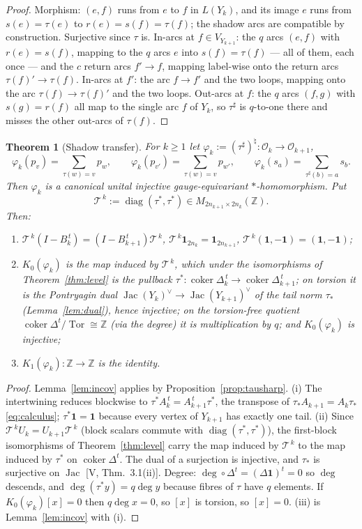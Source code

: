 \documentclass[11pt]{amsart}
\numberwithin{equation}{section}
\newtheorem{theorem}{Theorem}[section]
\theoremstyle{definition}
\theoremstyle{remark}
\newcommand{\Z}{\mathbb{Z}}
\newcommand{\cO}{\mathcal{O}}
\newcommand{\cT}{\mathcal{T}}
\newcommand{\Jac}{\operatorname{Jac}}
\newcommand{\coker}{\operatorname{coker}}
\newcommand{\Tor}{\operatorname{Tor}}
\newcommand{\ta}{\tau_*}
\newcommand{\taup}{\tau^*}
\newcommand{\shadow}[1]{{#1}^{\sharp}}
\newcommand{\Tup}{\cT^{\,k}}
\begin{document}
\begin{proof}
Morphism: $(e,f)$ runs from $e$ to $f$ in $L(Y_k)$, and its image $e$ runs from
$s(e)=\tau(e)$ to $r(e)=s(f)=\tau(f)$; the shadow arcs are compatible by construction.
Surjective since $\tau$ is. In-arcs at $f\in V_{Y_{k+1}}$: the $q$ arcs $(e,f)$ with
$r(e)=s(f)$, mapping to the $q$ arcs $e$ into $s(f)=\tau(f)$ --- all of them, each once ---
and the $c$ return arcs $f'\to f$, mapping label-wise onto the return arcs
$\tau(f)'\to\tau(f)$. In-arcs at $f'$: the arc $f\to f'$ and the two loops, mapping onto
the arc $\tau(f)\to\tau(f)'$ and the two loops. Out-arcs at $f$: the $q$ arcs $(f,g)$
with $s(g)=r(f)$ all map to the single arc $f$ of $Y_k$, so $\shadow\tau$ is $q$-to-one
there and misses the other out-arcs of $\tau(f)$.
\end{proof}

\begin{theorem}[Shadow transfer]\label{thm:transfer}
For $k\ge1$ let $\varphi_k:=(\shadow\tau)^{\natural}\colon\cO_k\to\cO_{k+1}$,
\[
\varphi_k(p_v)=\sum_{\tau(w)=v}p_w,\qquad \varphi_k(p_{v'})=\sum_{\tau(w)=v}p_{w'},\qquad
\varphi_k(s_a)=\sum_{\shadow\tau(b)=a}s_b .
\]
Then $\varphi_k$ is a canonical unital injective gauge-equivariant $*$-homomorphism.
Put
\[
\Tup:=\operatorname{diag}(\taup,\taup)\in M_{2n_{k+1}\times2n_k}(\Z).
\]
Then:
\begin{enumerate}
\item[(i)] $\Tup(I-B_k^{\,t})=(I-B_{k+1}^{\,t})\Tup$, $\Tup\mathbf1_{2n_k}=\mathbf1_{2n_{k+1}}$,
$\Tup(\mathbf1,-\mathbf1)=(\mathbf1,-\mathbf1)$;
\item[(ii)] $K_0(\varphi_k)$ is the map induced by $\Tup$, which under the
isomorphisms of Theorem~\ref{thm:level} is the pullback
$\taup\colon\coker\Delta_k^{\,t}\to\coker\Delta_{k+1}^{\,t}$; on torsion it is the
Pontryagin dual $\Jac(Y_k)^{\vee}\to\Jac(Y_{k+1})^{\vee}$ of the tail norm $\ta$
(Lemma~\ref{lem:dual}), hence injective; on the torsion-free quotient
$\coker\Delta^{t}/\Tor\cong\Z$ (via the degree) it is multiplication by $q$; and
$K_0(\varphi_k)$ is injective;
\item[(iii)] $K_1(\varphi_k)\colon\Z\to\Z$ is the identity.
\end{enumerate}
\end{theorem}

\begin{proof}
Lemma~\ref{lem:incov} applies by Proposition~\ref{prop:tausharp}. (i) The intertwining
reduces blockwise to $\taup A_k^{\,t}=A_{k+1}^{\,t}\taup$, the transpose of
$\ta A_{k+1}=A_k\ta$ \eqref{eq:calculus}; $\taup\mathbf1=\mathbf1$ because every vertex
of $Y_{k+1}$ has exactly one tail. (ii) Since $\Tup U_k=U_{k+1}\Tup$ (block scalars
commute with $\operatorname{diag}(\taup,\taup)$), the first-block isomorphisms of
Theorem~\ref{thm:level} carry the map induced by $\Tup$ to the map induced by $\taup$ on
$\coker\Delta^{t}$. The dual of a surjection is injective, and $\ta$ is surjective on
$\Jac$ [V, Thm.~3.1(ii)]. Degree: $\deg\circ\Delta^{t}=(\Delta\mathbf1)^t=0$ so $\deg$
descends, and $\deg(\taup y)=q\deg y$ because fibres of $\tau$ have $q$ elements. If
$K_0(\varphi_k)[x]=0$ then $q\deg x=0$, so $[x]$ is torsion, so $[x]=0$. (iii) is
Lemma~\ref{lem:incov} with (i).
\end{proof}
\end{document}
